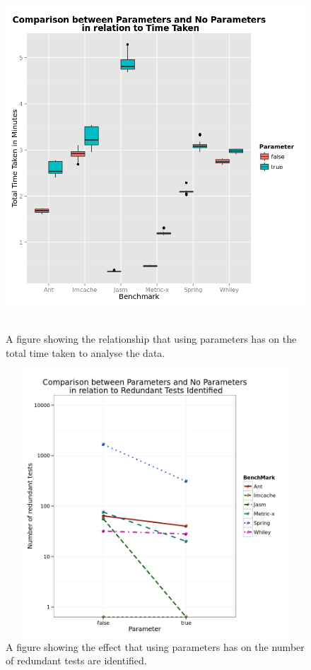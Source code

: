 \begin{figure}[h]
\centering
\includegraphics[width=\textwidth,height=13cm]{ParamTime.png}
\caption{A figure showing the relationship that using parameters has on the total time taken to analyse the data.}
\label{fig:paramtime}
\end{figure}

\begin{figure}[h]
\begin{center}
\includegraphics[height=10cm, width = 14.5cm]{Parameters.png}
\end{center}
\caption{A figure showing the effect that using parameters has on the number of redundant tests are identified.}
\label{fig:paramgraph}
\end{figure}

